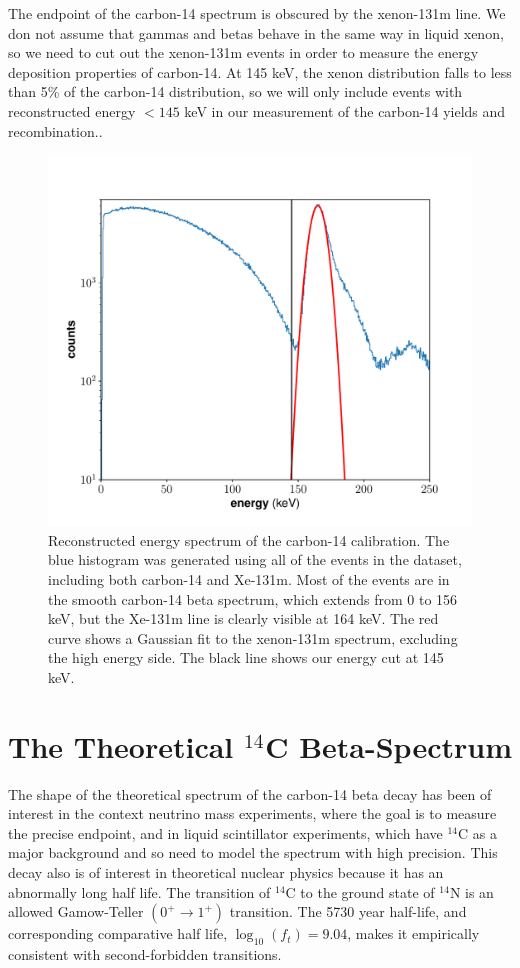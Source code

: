 The endpoint of the carbon-14 spectrum is obscured by the xenon-131m line. We don not assume that gammas and betas behave in the same way in liquid xenon, so we need to cut out the xenon-131m events in order to measure the energy deposition properties of carbon-14. At 145 keV, the xenon distribution falls to less than 5\% of the carbon-14 distribution, so we will only include events with reconstructed energy $<145$ keV in our measurement of the carbon-14 yields and recombination..
\begin{figure}[h!]
\centering
  \includegraphics[width=\textwidth]{Figures/C14_spec_init.pdf}
\caption{Reconstructed energy spectrum of the carbon-14 calibration. The blue histogram was generated using all of the events in the dataset, including both carbon-14 and Xe-131m. Most of the events are in the smooth carbon-14 beta spectrum, which extends from 0 to 156 keV, but the Xe-131m line is clearly visible at 164 keV. The red curve shows a Gaussian fit to the xenon-131m spectrum, excluding the high energy side. The black line shows our energy cut at 145 keV.}
\label{fig:c14Ecut}
\end{figure}



\section{The Theoretical $^{14}$C Beta-Spectrum}
The shape of the theoretical spectrum of the carbon-14 beta decay has been of interest in the context neutrino mass experiments\cite{C14_Wietfeldt}, where the goal is to measure the precise endpoint, and in liquid scintillator experiments, which have $^{14}$C as a major background and so need to model the spectrum with high precision\cite{C14_Borexino, C14_Bergeron}. This  decay also is of interest in theoretical nuclear physics because it has an abnormally long half life\cite{C14_Kuzminov,C14_Genz,C14_Garcia}. The transition of $^{14}$C to the ground state of $^{14}$N is an allowed Gamow-Teller $(0^+ \rightarrow 1^+)$ transition. The 5730 year half-life, and corresponding comparative half life, $\log_{10}(f_t)=9.04$, makes it empirically consistent with second-forbidden transitions\cite{C14_Kuzminov,C14_Wietfeldt}.

